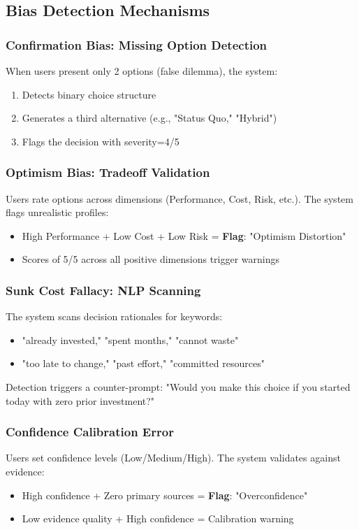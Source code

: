 \documentclass[conference]{IEEEtran}
\begin{document}
\subsection{Bias Detection Mechanisms}

\subsubsection{Confirmation Bias: Missing Option Detection}
When users present only 2 options (false dilemma), the system:
\begin{enumerate}
    \item Detects binary choice structure
    \item Generates a third alternative (e.g., "Status Quo," "Hybrid")
    \item Flags the decision with severity=4/5
\end{enumerate}

\subsubsection{Optimism Bias: Tradeoff Validation}
Users rate options across dimensions (Performance, Cost, Risk, etc.). The system flags unrealistic profiles:
\begin{itemize}
    \item High Performance + Low Cost + Low Risk = \textbf{Flag}: "Optimism Distortion"
    \item Scores of 5/5 across all positive dimensions trigger warnings
\end{itemize}

\subsubsection{Sunk Cost Fallacy: NLP Scanning}
The system scans decision rationales for keywords:
\begin{itemize}
    \item "already invested," "spent months," "cannot waste"
    \item "too late to change," "past effort," "committed resources"
\end{itemize}

Detection triggers a counter-prompt: "Would you make this choice if you started today with zero prior investment?"

\subsubsection{Confidence Calibration Error}
Users set confidence levels (Low/Medium/High). The system validates against evidence:
\begin{itemize}
    \item High confidence + Zero primary sources = \textbf{Flag}: "Overconfidence"
    \item Low evidence quality + High confidence = Calibration warning
\end{itemize}
\end{document}
